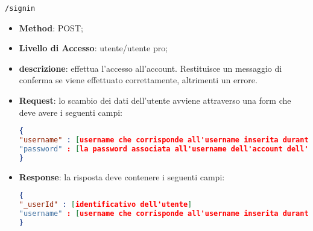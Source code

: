 	\item \texttt{/signin}
		\begin{itemize}
			\item \textbf{Method}: POST;
			\item \textbf{Livello di Accesso}: utente/utente pro;
			\item \textbf{descrizione}: effettua l'accesso all'account. Restituisce un messaggio di conferma se viene effettuato correttamente, altrimenti un errore.
			\item \textbf{Request}: lo scambio dei dati dell'utente avviene attraverso una form che deve avere i seguenti campi:
\begin{lstlisting}[language=json,firstnumber=1]
{
"username" : [username che corrisponde all'username inserita durante la registrazione]
"password" : [la password associata all'username dell'account dell'utente]
}
\end{lstlisting}
			\item \textbf{Response}: la risposta deve contenere i seguenti campi:
\begin{lstlisting}[language=json,firstnumber=1]
{
"_userId" : [identificativo dell'utente]
"username" : [username che corrisponde all'username inserita durante la registrazione]
}
\end{lstlisting}
		\end{itemize}
